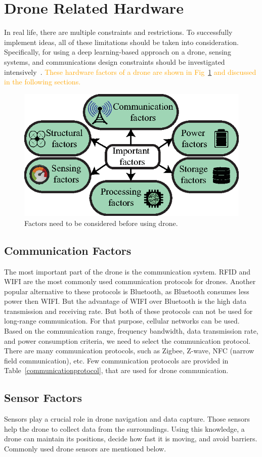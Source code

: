 \section{Drone Related Hardware}
\label{toolkitsection}
In real life, there are multiple constraints and restrictions. To successfully implement ideas, all of these limitations should be taken into consideration. Specifically, for using a deep learning-based approach on a drone, sensing systems, and communications design constraints should be investigated intensively~\cite{fraga2019review}. \textcolor{orange}{These hardware factors of a drone are shown in Fig~\ref{hardware} and discussed in the following sections.}
\begin{figure}[h!]
\centering
\includegraphics[width=.7\linewidth]{figure/hardware.eps}
\caption{Factors need to be considered before using drone.}
\label{hardware}
\end{figure}
\subsection{Communication Factors}
The most important part of the drone is the communication system. RFID and WIFI are the most commonly used communication protocols for drones. Another popular alternative to these protocols is Bluetooth, as Bluetooth consumes less power then WIFI. But the advantage of WIFI over Bluetooth is the high data transmission and receiving rate. But both of these protocols can not be used for long-range communication. For that purpose, cellular networks can be used. Based on the communication range, frequency bandwidth, data transmission rate, and power consumption criteria, we need to select the communication protocol. There are many communication protocols, such as Zigbee, Z-wave, NFC (narrow field communication), etc. Few communication protocols are provided in Table~\ref{communicationprotocol}, that are used for drone communication.


\subsection{Sensor Factors}
Sensors play a crucial role in drone navigation and data capture. Those sensors help the drone to collect data from the surroundings. Using this knowledge, a drone can maintain its positions, decide how fast it is moving, and avoid barriers. Commonly used drone sensors are mentioned below.

